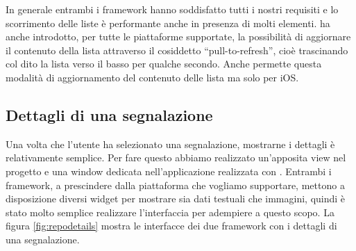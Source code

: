             \clearpage
            \noindent In generale entrambi i framework hanno soddisfatto tutti
            i nostri requisiti e lo scorrimento delle liste è
            performante anche in presenza di molti elementi. \kendomob{} ha
            anche introdotto, per tutte le piattaforme supportate, la
            possibilità di aggiornare il contenuto della
            lista attraverso il cosiddetto ``pull-to-refresh'', cioè
            trascinando col dito la lista verso il basso per qualche secondo.
            Anche \tisdk{} permette questa modalità di aggiornamento del
            contenuto delle lista ma solo per iOS.

        \subsection{Dettagli di una segnalazione}
        \label{subsec:dettagli}
            Una volta che l'utente ha selezionato una segnalazione, mostrarne i
            dettagli è relativamente semplice. Per fare questo abbiamo
            realizzato un'apposita view \kendomob{} nel progetto \pg{} e una
            window dedicata nell'applicazione realizzata con \tisdk{}. Entrambi
            i framework, a prescindere dalla piattaforma che vogliamo
            supportare, mettono a disposizione diversi widget per mostrare sia
            dati testuali che immagini, quindi è stato molto semplice realizzare
            l'interfaccia per adempiere a questo scopo. La figura
            \ref{fig:repodetails} mostra le interfacce dei due framework con i
            dettagli di una segnalazione.

